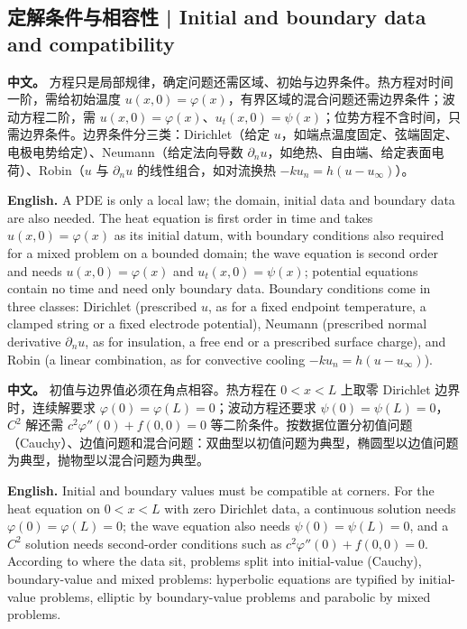 \documentclass[UTF8,11pt,a4paper]{ctexart}
\newcommand{\APS}[2]{\par\noindent\textbf{中文。} #1\par\noindent\textbf{English.} #2\par\smallskip}
\begin{document}
\subsection{定解条件与相容性 | Initial and boundary data and compatibility}
\APS{方程只是局部规律，确定问题还需区域、初始与边界条件。热方程对时间一阶，需给初始温度 $u(x,0)=\varphi(x)$，有界区域的混合问题还需边界条件；波动方程二阶，需 $u(x,0)=\varphi(x)$、$u_t(x,0)=\psi(x)$；位势方程不含时间，只需边界条件。边界条件分三类：Dirichlet（给定 $u$，如端点温度固定、弦端固定、电极电势给定）、Neumann（给定法向导数 $\partial_nu$，如绝热、自由端、给定表面电荷）、Robin（$u$ 与 $\partial_nu$ 的线性组合，如对流换热 $-ku_n=h(u-u_\infty)$）。}{A PDE is only a local law; the domain, initial data and boundary data are also needed. The heat equation is first order in time and takes $u(x,0)=\varphi(x)$ as its initial datum, with boundary conditions also required for a mixed problem on a bounded domain; the wave equation is second order and needs $u(x,0)=\varphi(x)$ and $u_t(x,0)=\psi(x)$; potential equations contain no time and need only boundary data. Boundary conditions come in three classes: Dirichlet (prescribed $u$, as for a fixed endpoint temperature, a clamped string or a fixed electrode potential), Neumann (prescribed normal derivative $\partial_nu$, as for insulation, a free end or a prescribed surface charge), and Robin (a linear combination, as for convective cooling $-ku_n=h(u-u_\infty)$).}
\APS{初值与边界值必须在角点相容。热方程在 $0<x<L$ 上取零 Dirichlet 边界时，连续解要求 $\varphi(0)=\varphi(L)=0$；波动方程还要求 $\psi(0)=\psi(L)=0$，$C^2$ 解还需 $c^2\varphi''(0)+f(0,0)=0$ 等二阶条件。按数据位置分初值问题（Cauchy）、边值问题和混合问题：双曲型以初值问题为典型，椭圆型以边值问题为典型，抛物型以混合问题为典型。}{Initial and boundary values must be compatible at corners. For the heat equation on $0<x<L$ with zero Dirichlet data, a continuous solution needs $\varphi(0)=\varphi(L)=0$; the wave equation also needs $\psi(0)=\psi(L)=0$, and a $C^2$ solution needs second-order conditions such as $c^2\varphi''(0)+f(0,0)=0$. According to where the data sit, problems split into initial-value (Cauchy), boundary-value and mixed problems: hyperbolic equations are typified by initial-value problems, elliptic by boundary-value problems and parabolic by mixed problems.}
\end{document}
